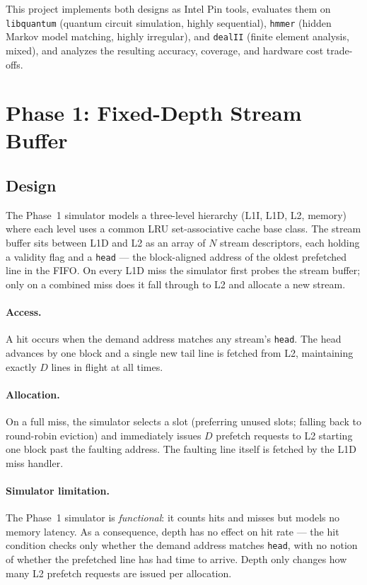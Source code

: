 \documentclass[11pt,letterpaper]{article}
\begin{document}
This project implements both designs as Intel Pin tools, evaluates them on
\texttt{libquantum} (quantum circuit simulation, highly sequential),
\texttt{hmmer} (hidden Markov model matching, highly irregular), and
\texttt{dealII} (finite element analysis, mixed), and analyzes the resulting
accuracy, coverage, and hardware cost trade-offs.

\section{Phase 1: Fixed-Depth Stream Buffer}

\subsection{Design}

The Phase~1 simulator models a three-level hierarchy (L1I, L1D, L2, memory)
where each level uses a common LRU set-associative cache base class. The
stream buffer sits between L1D and L2 as an array of $N$ stream descriptors,
each holding a validity flag and a \texttt{head} — the block-aligned address
of the oldest prefetched line in the FIFO. On every L1D miss the simulator
first probes the stream buffer; only on a combined miss does it fall through
to L2 and allocate a new stream.

\paragraph{Access.} A hit occurs when the demand address matches any
stream's \texttt{head}. The head advances by one block and a single new tail
line is fetched from L2, maintaining exactly $D$ lines in flight at all times.

\paragraph{Allocation.} On a full miss, the simulator selects a slot
(preferring unused slots; falling back to round-robin eviction) and immediately
issues $D$ prefetch requests to L2 starting one block past the faulting
address. The faulting line itself is fetched by the L1D miss handler.

\paragraph{Simulator limitation.} The Phase~1 simulator is \emph{functional}:
it counts hits and misses but models no memory latency. As a consequence,
depth has no effect on hit rate — the hit condition checks only whether the
demand address matches \texttt{head}, with no notion of whether the prefetched
line has had time to arrive. Depth only changes how many L2 prefetch requests
are issued per allocation.
\end{document}
